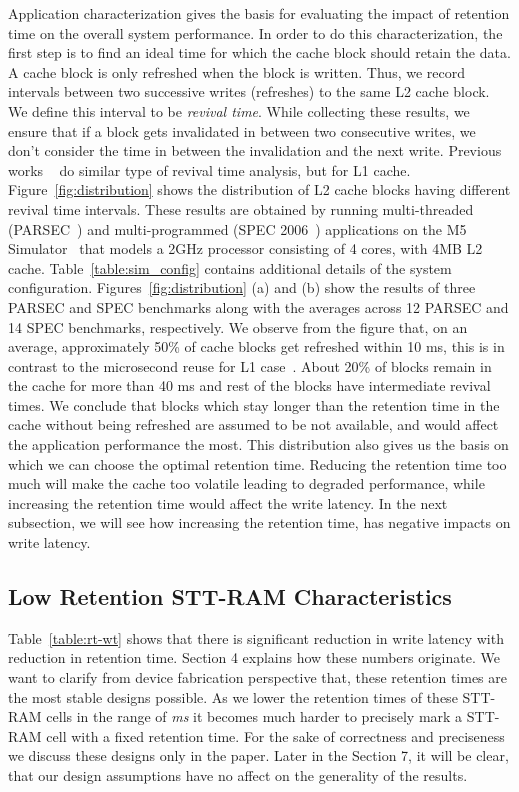 Application characterization gives the basis for evaluating the impact of retention time on the overall system performance. In order to do this characterization, the first step is to  find an ideal time for which the cache block should retain the data.  A cache block is only refreshed when the block is written. Thus, we record intervals between two successive writes (refreshes) to the same L2 cache block. We define this interval to be {\it revival time}. While collecting these results, we ensure that if a block gets invalidated in between two consecutive writes, we don't consider the time in between the invalidation and the next write. Previous works ~\cite{brooks} do similar type of revival time analysis, but for L1 cache. Figure~\ref{fig:distribution} shows the distribution of L2 cache blocks having different revival time intervals. These results are obtained by running multi-threaded (PARSEC~\cite{PARSEC}) and multi-programmed (SPEC 2006~\cite{SPEC}) applications on the M5 Simulator~\cite{M5} that models a 2GHz processor consisting of 4 cores, with 4MB L2 cache. Table~\ref{table:sim_config} contains additional details of the system configuration. Figures~\ref{fig:distribution} (a) and (b) show the results of three PARSEC and SPEC benchmarks along with the averages across 12 PARSEC  and 14 SPEC benchmarks, respectively. We observe from the figure that, on an average, approximately 50\% of cache blocks get refreshed within 10 ms, this is in contrast to the microsecond reuse for L1 case~\cite{brooks}. About 20\% of blocks remain in the cache for more than 40 ms and rest of the blocks have intermediate revival times. We conclude that blocks which stay longer than the retention time in the cache without being refreshed are assumed to be not available, and would affect the application performance the most. This distribution also gives us the basis on which we can choose the optimal retention time. Reducing the retention time too much will make the cache too volatile leading to degraded performance, while increasing the retention time would affect the write latency. In the next subsection, we will see how increasing the retention time, has negative impacts on write latency. 



\subsection{Low Retention STT-RAM Characteristics}
Table~\ref{table:rt-wt} shows that there is significant reduction in write latency with reduction in retention time. Section 4 explains how these numbers originate. We want to clarify from device fabrication perspective that, these retention times are the most stable designs possible. As we lower the retention times of these STT-RAM cells in the range of {\it ms} it becomes much harder to precisely mark a STT-RAM cell with a fixed retention time. For the sake of correctness and preciseness we discuss these designs only in the paper. Later in the Section 7, it will be clear, that our design assumptions have no affect on the generality of the results.

